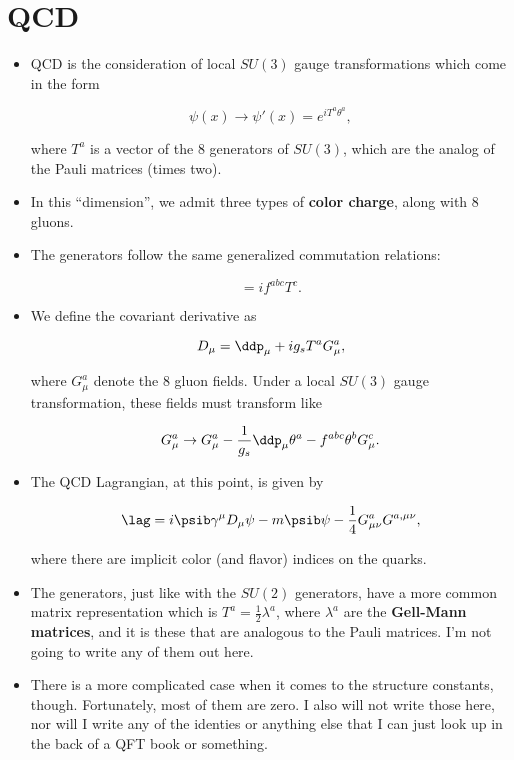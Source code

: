 \section{QCD}

\begin{itemize}
\item QCD is the consideration of local $SU(3)$ gauge transformations which come in the form

  \begin{equation}
    \psi(x) \rightarrow \psi'(x) = e^{iT^a\theta^a},
  \end{equation}

  where $T^a$ is a vector of the 8 generators of $SU(3)$, which are the analog of the Pauli matrices (times two).

\item In this ``dimension'', we admit three types of \textbf{color charge}, along with 8 gluons.
\item The generators follow the same generalized commutation relations:

  \begin{equation}
    [T^a,T^b] = if^{abc}T^c.
  \end{equation}

\item We define the covariant derivative as

  \begin{equation}
    D_\mu = \ddp_\mu + ig_s T^aG^a_\mu,
  \end{equation}

  where $G^a_\mu$ denote the 8 gluon fields. Under a local $SU(3)$ gauge transformation, these fields must transform like

  \begin{equation}
    G^a_\mu \rightarrow G^a_\mu - \frac{1}{g_s}\ddp_\mu \theta^a - f^{abc}\theta^bG^c_\mu.
  \end{equation}

\item The QCD Lagrangian, at this point, is given by

  \begin{equation}
    \lag = i\psib \gamma^\mu D_{\mu} \psi - m\psib\psi  - \frac{1}{4}G^a_{\mu\nu}G^{a,\mu\nu},
  \end{equation}

  where there are implicit color (and flavor) indices on the quarks.

\item The generators, just like with the $SU(2)$ generators, have a more common matrix representation which is $T^a = \frac{1}{2}\lambda^a$, where $\lambda^a$ are the \textbf{Gell-Mann matrices}, and it is these that are analogous to the Pauli matrices. I'm not going to write any of them out here.
\item There is a more complicated case when it comes to the structure constants, though. Fortunately, most of them are zero. I also will not write those here, nor will I write any of the identies or anything else that I can just look up in the back of a QFT book or something.
  
\end{itemize}


